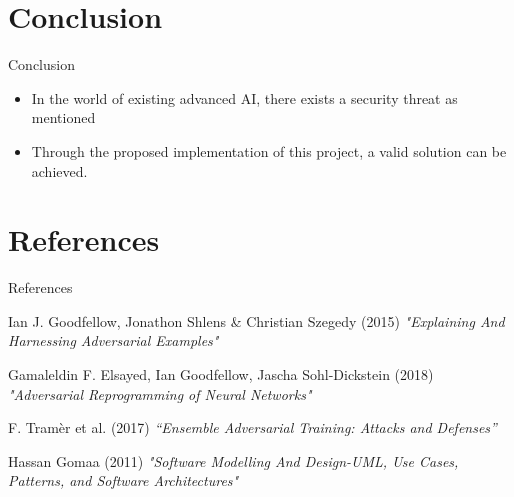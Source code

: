 \documentclass[10pt]{beamer}
\begin{document}
\section{Conclusion}
\begin{frame}{Conclusion}
\begin{itemize}
    \item In the world of existing advanced AI, there exists a security threat as mentioned
    \item Through the proposed implementation of this project, a valid solution can be achieved.
\end{itemize}

\end{frame}


\section{References}

\begin{frame}{References}

  
  
\footnotesize{
\begin{thebibliography}{99}

Ian J. Goodfellow, Jonathon Shlens & Christian Szegedy (2015)
\newblock \emph{"Explaining And Harnessing Adversarial Examples"}

Gamaleldin F. Elsayed, Ian Goodfellow, Jascha Sohl-Dickstein  (2018)
\newblock \emph{"Adversarial Reprogramming of Neural Networks"}

 F. Tramèr et al. (2017)
\newblock \emph{“Ensemble Adversarial Training: Attacks and
Defenses” }

Hassan Gomaa (2011)
\newblock \emph{"Software Modelling And Design-UML, Use Cases, Patterns, and
Software Architectures"}
\end{thebibliography}
}

\end{frame}
\end{document}
